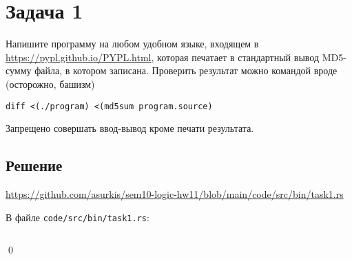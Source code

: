\section{Задача 1}
Напишите программу на любом удобном языке,
входящем в \url{https://pypl.github.io/PYPL.html},
которая печатает в стандартный вывод MD5-сумму файла,
в котором записана.
Проверить результат можно командой вроде (осторожно, башизм)
\begin{verbatim}
diff <(./program) <(md5sum program.source)
\end{verbatim}
Запрещено совершать ввод-вывод кроме печати результата.

\subsection{Решение}
\url{https://github.com/asurkis/sem10-logic-hw11/blob/main/code/src/bin/task1.rs}

В файле \texttt{code/src/bin/task1.rs}:

\inputminted{rust}{code/src/bin/task1.rs}

\qed
